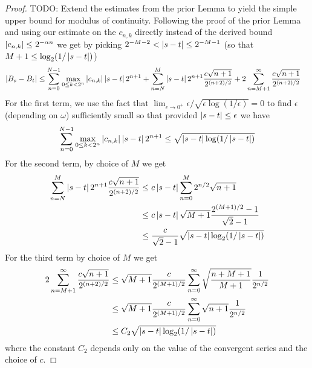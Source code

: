 \begin{proof}
TODO:  Extend the estimates from the prior Lemma to yield the simple upper bound for
modulus of continuity.  Following the proof of the prior Lemma and
using our estimate on the $c_{n,k}$ directly instead of the derived
bound $\left \vert c_{n,k} \right \vert \leq 2^{-\alpha n}$ we get by picking $2^{-M-2}
< \left \vert s-t \right \vert \leq 2^{-M-1}$ (so that $M+1 \leq \log_2(1/\left \vert s-t \right \vert)$)
\begin{align*}
\left \vert B_s - B_t \right \vert &\leq \sum_{n=0}^{N-1} \max_{0 \leq k < 2^n}
\left \vert c_{n,k} \right \vert \left \vert s-t \right \vert 2^{n+1} +
\sum_{n=N}^M \left \vert s-t \right \vert 2^{n+1} \frac{c\sqrt{n+1}}{2^{(n+2)/2}} + 
2 \sum_{n=M+1}^\infty  \frac{c\sqrt{n+1}}{2^{(n+2)/2}}
\end{align*}
For the first term, we use the fact that $\lim_{\epsilon \to 0^+}
\epsilon/\sqrt{\epsilon \log(1/\epsilon)} = 0$ to find $\epsilon$ 
(depending on $\omega$) sufficiently small so that provided $\left \vert s-t \right \vert \leq
\epsilon$ we have 
\begin{align*}
\sum_{n=0}^{N-1} \max_{0 \leq k < 2^n}
\left \vert c_{n,k} \right \vert \left \vert s-t \right \vert 2^{n+1} \leq \sqrt{\left \vert s-t \right \vert
  \log(1/\left \vert s-t \right \vert)}
\end{align*}
For the second term, by choice of $M$ we get
\begin{align*}
\sum_{n=N}^M \left \vert s-t \right \vert 2^{n+1} \frac{c\sqrt{n+1}}{2^{(n+2)/2}} 
&\leq c \left \vert s-t \right \vert \sum_{n=0}^M 2^{n/2} \sqrt{n+1} \\
&\leq  c \left \vert s-t \right \vert   \sqrt{M+1} \frac{2^{(M+1)/2}-1}{\sqrt{2}-1}\\
&\leq \frac{c}{\sqrt{2}-1}
  \sqrt{\left \vert s-t \right \vert \log_2(1/\left \vert s-t \right \vert)}
\end{align*}
For the third term by choice of $M$ we get
\begin{align*}
2 \sum_{n=M+1}^\infty  \frac{c\sqrt{n+1}}{2^{(n+2)/2}}
&\leq \sqrt{M+1} \frac{c}{2^{(M+1)/2}} \sum_{n=0}^\infty
\sqrt{\frac{n+M+1}{M+1}} \frac{1}{2^{n/2}} \\
&\leq \sqrt{M+1} \frac{c}{2^{(M+1)/2}} \sum_{n=0}^\infty
\sqrt{n+1} \frac{1}{2^{n/2}} \\
&\leq C_2 \sqrt{\left \vert s-t \right \vert\log_2(1/\left \vert s-t \right \vert)}
\end{align*}
where the constant $C_2$ depends only on the value of the convergent
series and the choice of $c$.
\end{proof}

